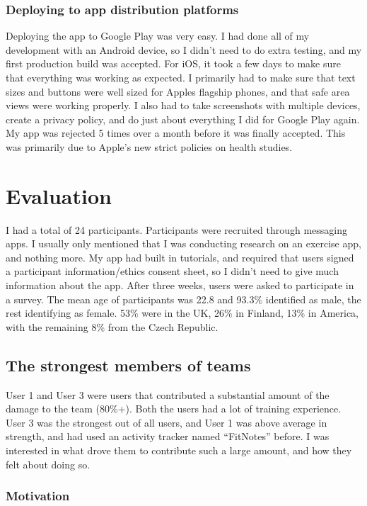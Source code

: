 \documentclass{l4proj}
\begin{document}
\subsection{Deploying to app distribution platforms}
Deploying the app to Google Play was very easy. I had done all of my development with an Android device, so I didn't need to do extra testing, and my first production build was accepted. For iOS, it took a few days to make sure that everything was working as expected. I primarily had to make sure that text sizes and buttons were well sized for Apples flagship phones, and that safe area views were working properly. I also had to take screenshots with multiple devices, create a privacy policy, and do just about everything I did for Google Play again. My app was rejected 5 times over a month before it was finally accepted. This was primarily due to Apple's new strict policies on health studies.

\chapter{Evaluation}
I had a total of 24 participants. Participants were recruited through messaging apps. I usually only mentioned that I was conducting research on an exercise app, and nothing more. My app had built in tutorials, and required that users signed a participant information/ethics consent sheet, so I didn't need to give much information about the app. After three weeks, users were asked to participate in a survey. The mean age of participants was 22.8 and 93.3\% identified as male, the rest identifying as female. 53\% were in the UK, 26\% in Finland, 13\% in America, with the remaining 8\% from the Czech Republic. 

\section{The strongest members of teams}
User 1 and User 3 were users that contributed a substantial amount of the damage to the team (80\%+). Both the users had a lot of training experience. User 3 was the strongest out of all users, and User 1 was above average in strength, and had used an activity tracker named ``FitNotes'' before. I was interested in what drove them to contribute such a large amount, and how they felt about doing so. 

\subsection{Motivation}
\end{document}
